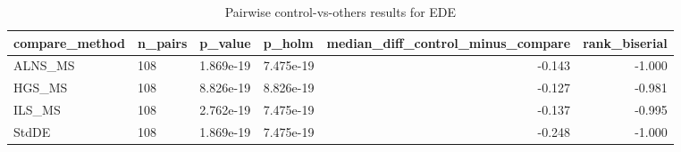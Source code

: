 \begin{table}[!t]
\centering
\caption{Pairwise control-vs-others results for EDE}
\label{tab:posthoc_holm_generated}
\begin{tabular}{llllrr}
\toprule
compare_method & n_pairs & p_value & p_holm & median_diff_control_minus_compare & rank_biserial \\
\midrule
ALNS_MS & 108 & 1.869e-19 & 7.475e-19 & -0.143 & -1.000 \\
HGS_MS & 108 & 8.826e-19 & 8.826e-19 & -0.127 & -0.981 \\
ILS_MS & 108 & 2.762e-19 & 7.475e-19 & -0.137 & -0.995 \\
StdDE & 108 & 1.869e-19 & 7.475e-19 & -0.248 & -1.000 \\
\bottomrule
\end{tabular}

\end{table}